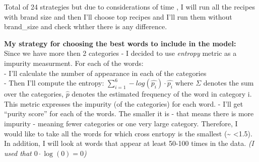 \documentclass[
]{article}
\newenvironment{Shaded}{\begin{snugshade}}{\end{snugshade}}
\newcommand{\CommentTok}[1]{\textcolor[rgb]{0.56,0.35,0.01}{\textit{#1}}}
\newcommand{\DataTypeTok}[1]{\textcolor[rgb]{0.13,0.29,0.53}{#1}}
\newcommand{\DecValTok}[1]{\textcolor[rgb]{0.00,0.00,0.81}{#1}}
\newcommand{\KeywordTok}[1]{\textcolor[rgb]{0.13,0.29,0.53}{\textbf{#1}}}
\newcommand{\NormalTok}[1]{#1}
\newcommand{\OperatorTok}[1]{\textcolor[rgb]{0.81,0.36,0.00}{\textbf{#1}}}
\newcommand{\OtherTok}[1]{\textcolor[rgb]{0.56,0.35,0.01}{#1}}
\newcommand{\StringTok}[1]{\textcolor[rgb]{0.31,0.60,0.02}{#1}}
\begin{document}
Total of 24 strategies but due to considerations of time , I will run
all the recipes with brand size and then I'll choose top recipes and
I'll run them without brand\_size and check whther there is any
difference.

\textbf{My strategy for choosing the best words to include in the
model:}\\
Since we have more then 2 categories - I decided to use \emph{entropy}
metric as a impurity measurment. For each of the words:\\
- I'll calculate the number of appearance in each of the categories\\
- Then I'll compute the entropy:
\(\sum_{i=1}^{6} -log(\hat{p_{i}})\cdot \hat{p_i}\) where \(\Sigma\)
denotes the sum over the categories, \(\hat{p}\) denotes the estimated
frequency of the word in category i. This metric expresses the impurity
(of the categories) for each word. - I'll get ``purity score'' for each
of the words. The smaller it is - that means there is more impurity -
meaning fewer categories or one very large category. Therefore, I would
like to take all the words for which cross enrtopy is the smallest
(\textasciitilde{} \textless1.5).\\
In addition, I will look at words that appear at least 50-100 times in
the data. \emph{(I used that \(0\cdot \log(0)=0\))}

\begin{Shaded}
\end{Shaded}
\end{document}
